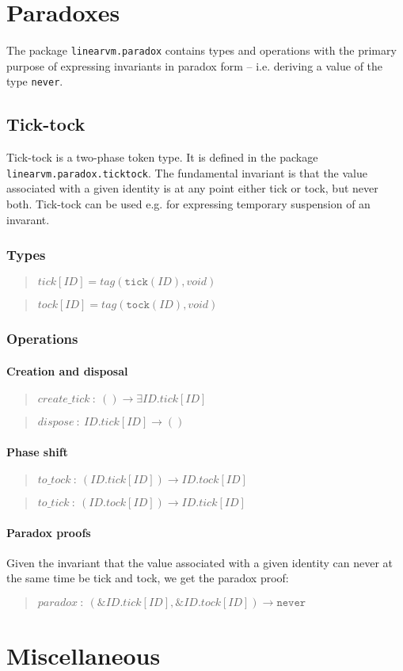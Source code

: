 \documentclass[a4paper]{book}
\newcommand\TypeDefinition[1]{\begin{quote}$\mathit{#1}$\end{quote}}
\newcommand\FuncSignature[2]{\begin{quote}$\mathit{#1}\ :\ \mathit{#2}$\end{quote}}
\begin{document}
\chapter{Paradoxes}
The package \texttt{linearvm.paradox} contains types and operations
with the primary purpose of expressing invariants in paradox form --
i.e. deriving a value of the type \texttt{never}.

\section{Tick-tock}
Tick-tock is a two-phase token type.
It is defined in the package \texttt{linearvm.paradox.ticktock}.
The fundamental invariant is that the value associated with a given identity
is at any point either tick or tock, but never both.
Tick-tock can be used e.g. for expressing temporary suspension of an invarant.

\subsection*{Types}
\TypeDefinition{tick[ID] = tag(\texttt{tick}(ID), void)}
\TypeDefinition{tock[ID] = tag(\texttt{tock}(ID), void)}

\subsection*{Operations}
\subsubsection*{Creation and disposal}
\FuncSignature{create\_tick}{() \to \exists ID.tick[ID]}
\FuncSignature{dispose}{ID.tick[ID] \to ()}

\subsubsection*{Phase shift}
\FuncSignature{to\_tock}{(ID.tick[ID]) \to ID.tock[ID]}
\FuncSignature{to\_tick}{(ID.tock[ID]) \to ID.tick[ID]}

\subsubsection*{Paradox proofs}
Given the invariant that the value associated with a given identity
can never at the same time be tick and tock, we get the paradox proof:
\FuncSignature{paradox}{(\&ID.tick[ID], \&ID.tock[ID]) \to \texttt{never}}

\chapter{Miscellaneous}
\end{document}
